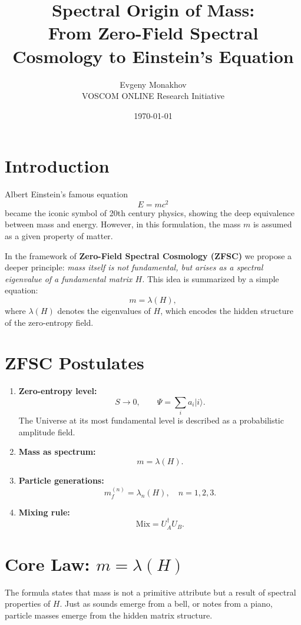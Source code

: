 \documentclass[12pt,a4paper]{article}
\title{Spectral Origin of Mass: \\ 
From Zero-Field Spectral Cosmology to Einstein's Equation}
\author{Evgeny Monakhov \\ VOSCOM ONLINE Research Initiative}
\date{\today}
\begin{document}
\maketitle

\section*{Introduction}
Albert Einstein’s famous equation
\[
E = mc^2
\]
became the iconic symbol of 20th century physics, showing the deep equivalence between mass and energy.  
However, in this formulation, the mass $m$ is assumed as a given property of matter.  

In the framework of \textbf{Zero-Field Spectral Cosmology (ZFSC)} we propose a deeper principle:  
\emph{mass itself is not fundamental, but arises as a spectral eigenvalue of a fundamental matrix $H$.}  
This idea is summarized by a simple equation:
\[
m = \lambda(H),
\]
where $\lambda(H)$ denotes the eigenvalues of $H$, which encodes the hidden structure of the zero-entropy field.

\section*{ZFSC Postulates}
\begin{enumerate}
  \item \textbf{Zero-entropy level:}
  \[
  S \to 0, \qquad 
  \Psi = \sum_i a_i |i\rangle .
  \]
  The Universe at its most fundamental level is described as a probabilistic amplitude field.

  \item \textbf{Mass as spectrum:}
  \[
  m = \lambda(H).
  \]

  \item \textbf{Particle generations:}
  \[
  m^{(n)}_f = \lambda_n(H), \quad n=1,2,3.
  \]

  \item \textbf{Mixing rule:}
  \[
  \mathrm{Mix} = U_A^\dagger U_B.
  \]
\end{enumerate}

\section*{Core Law: $m = \lambda(H)$}
The formula states that mass is not a primitive attribute but a result of spectral properties of $H$.  
Just as sounds emerge from a bell, or notes from a piano, particle masses emerge from the hidden matrix structure.
\end{document}
